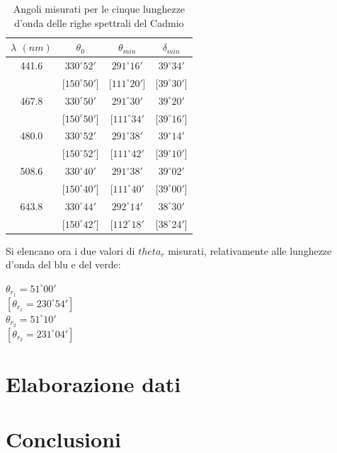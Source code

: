 \documentclass{article}
\begin{document}
\begin{table}[h]
 \center
 \begin{tabular}{|c|c|c|c|}
   \hline
   $\lambda$ $(nm)$ & $\theta_0$ & $\theta_{min}$ & $\delta_{min}$ \\ \hline
   441.6 & $330^{\circ} 52'$ & $291^{\circ} 16'$ & $39^{\circ} 34'$ \\
         & [$150^{\circ} 50'$] & [$111^{\circ} 20'$] & [$39^{\circ} 30'$] \\ \hline
   467.8 & $330^{\circ} 50'$ & $291^{\circ} 30'$ & $39^{\circ} 20'$ \\ 
         & [$150^{\circ} 50'$] & [$111^{\circ} 34'$ & [$39^{\circ} 16'$] \\ \hline
   480.0 & $330^{\circ} 52'$ & $291^{\circ} 38'$ & $39^{\circ} 14'$ \\ 
         & [$150^{\circ} 52'$] & [$111^{\circ} 42'$ & [$39^{\circ} 10'$] \\ \hline
   508.6 & $330^{\circ} 40'$ & $291^{\circ} 38'$ & $39^{\circ} 02'$ \\ 
         & [$150^{\circ} 40'$] & [$111^{\circ} 40'$ & [$39^{\circ} 00'$] \\ \hline
   643.8 & $330^{\circ} 44'$ & $292^{\circ} 14'$ & $38^{\circ} 30'$ \\ 
         & [$150^{\circ} 42'$] & [$112^{\circ} 18'$ & [$38^{\circ} 24'$] \\ \hline
 \end{tabular}
 \caption{Angoli misurati per le cinque lunghezze d'onda delle righe spettrali del Cadmio}
\end{table}

Si elencano ora i due valori di $theta_r$ misurati, relativamente alle lunghezze d'onda del blu e del verde: \\
\begin{center}
$\theta_{r_1} = 51^{\circ} 00' $ \\
$[\theta_{r_1} = 230^{\circ} 54']$ \\
$\theta_{r_2} = 51^{\circ} 10'$ \\
$[\theta_{r_2} = 231^{\circ} 04']$ 
\end{center}


\newpage
\section{Elaborazione dati}


\newpage
\section{Conclusioni}
\end{document}

